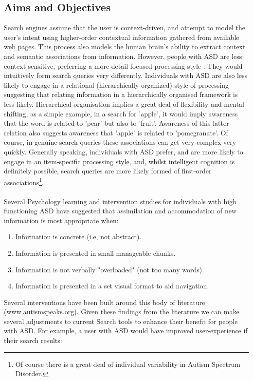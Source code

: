 \documentclass[10pt]{article}
\begin{document}
\subsection{Aims and Objectives}\label{the problem}
Search engines assume that the user is context-driven, and attempt to model the user's intent using higher-order contextual information gathered from available web pages. This process also models the human brain's ability to extract context and semantic associations from information. However, people with ASD are less context-sensitive, preferring a more detail-focused processing style \cite{mottron}. They would intuitively form search queries very differently. Individuals with ASD are also less likely to engage in a relational (hierarchically organized) style of processing \cite{bowler} suggesting that relating information in a hierarchically organised framework is less likely. Hierarchical organisation implies a great deal of flexibility and mental-shifting, as a simple example, in a search for 'apple', it would imply awareness that the word is related to 'pear' but also to 'fruit'. Awareness of this latter relation also suggests awareness that 'apple' is related to 'pomegranate'. Of course, in genuine search queries these associations can get very complex very quickly. Generally speaking, individuals with ASD prefer, and are more likely to engage in an item-specific processing style, and, whilst intelligent cognition is definitely possible, search queries are more likely formed of first-order associations\footnote{Of course there is a great deal of individual variability in Autism Spectrum Disorder.}. \\
\\Several Psychology learning and intervention studies for individuals with high functioning ASD have suggested that assimilation and accommodation of new information is most appropriate when:\\
\begin{enumerate}
\item Information is concrete (i.e, not abstract).
\item Information is presented in small manageable chunks.
\item Information is not verbally "overloaded" (not too many words).
\item Information is presented in a set visual format to aid navigation.
\end{enumerate}
Several interventions have been built around this body of literature (www.autismspeaks.org).
Given these findings from the literature we can make several adjustments to current Search tools to enhance their benefit for people with ASD. For example, a user with ASD would have improved user-experience if their search results:
\end{document}
